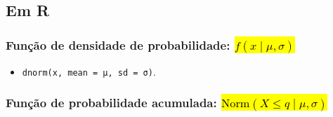 \documentclass[
  11pt]{report}
\providecommand{\tightlist}{%
  \setlength{\itemsep}{0pt}\setlength{\parskip}{0pt}}
\begin{document}
\hypertarget{em-r-6}{%
\subsection{Em R}\label{em-r-6}}

\hypertarget{funuxe7uxe3o-de-densidade-de-probabilidade-fx-mid-mu-sigma}{%
\subsubsection*{\texorpdfstring{Função de densidade de probabilidade: {\hl{$f(x \mid \mu, \sigma)$}}}{Função de densidade de probabilidade: }}\label{funuxe7uxe3o-de-densidade-de-probabilidade-fx-mid-mu-sigma}}

\begin{itemize}
\tightlist
\item
  \texttt{dnorm(x,\ mean\ =\ μ,\ sd\ =\ σ)}.
\end{itemize}

\hypertarget{funuxe7uxe3o-de-probabilidade-acumulada-textnormx-leq-q-mid-mu-sigma}{%
\subsubsection*{\texorpdfstring{Função de probabilidade acumulada: {\hl{$\text{Norm}(X \leq q \mid \mu, \sigma)$}}}{Função de probabilidade acumulada: }}\label{funuxe7uxe3o-de-probabilidade-acumulada-textnormx-leq-q-mid-mu-sigma}}
\end{document}
